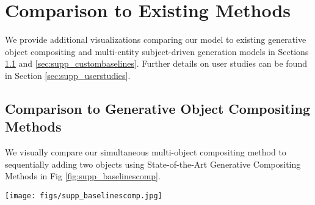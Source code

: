 
\section{Comparison to Existing Methods}

We provide additional visualizations comparing our model to existing generative object compositing and multi-entity subject-driven generation models in Sections \ref{sec:supp_compbaselines} and \ref{sec:supp_custombaselines}. Further details on user studies can be found in Section \ref{sec:supp_userstudies}.

\subsection{Comparison to Generative Object Compositing Methods}
\label{sec:supp_compbaselines}

We visually compare our simultaneous multi-object compositing method to sequentially adding two objects using State-of-the-Art Generative Compositing Methods \cite{yang2023paintbyexample,zhang2023controlcom,chen2023anydoor,song2024imprint,tarres2024thinking} in Fig \ref{fig:supp_baselinescomp}.

\begin{figure*}[t]
    \centering
    \texttt{[image: figs/supp\_baselinescomp.jpg]}
    \caption{Visual comparison of our Multi-Object Compositing Method and State-of-the-Art Generative Object Compositing Methods \cite{yang2023paintbyexample,zhang2023controlcom,chen2023anydoor,song2024imprint,tarres2024thinking}.}

    \label{fig:supp_baselinescomp}
\end{figure*}


